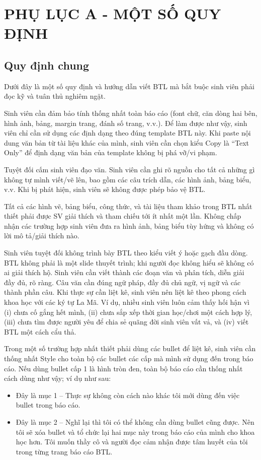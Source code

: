 \chapter*{PHỤ LỤC A - MỘT SỐ QUY ĐỊNH}
\section*{Quy định chung}
Dưới đây là một số quy định và hướng dẫn viết BTL mà bắt buộc sinh viên phải đọc kỹ và tuân thủ nghiêm ngặt.

Sinh viên cần đảm bảo tính thống nhất toàn báo cáo (font chữ, căn dòng hai bên, hình ảnh, bảng, margin trang, đánh số trang, v.v.). Để làm được như vậy, sinh viên chỉ cần sử dụng các định dạng theo đúng template BTL này. Khi paste nội dung văn bản từ tài liệu khác của mình, sinh viên cần chọn kiểu Copy là “Text Only” để định dạng văn bản của template không bị phá vỡ/vi phạm.

Tuyệt đối cấm sinh viên đạo văn. Sinh viên cần ghi rõ nguồn cho tất cả những gì không tự mình viết/vẽ lên, bao gồm các câu trích dẫn, các hình ảnh, bảng biểu, v.v. Khi bị phát hiện, sinh viên sẽ không được phép bảo vệ BTL.

Tất cả các hình vẽ, bảng biểu, công thức, và tài liệu tham khảo trong BTL nhất thiết phải được SV giải thích và tham chiếu tới ít nhất một lần. Không chấp nhận các trường hợp sinh viên đưa ra hình ảnh, bảng biểu tùy hứng và không có lời mô tả/giải thích nào.

Sinh viên tuyệt đối không trình bày BTL theo kiểu viết ý hoặc gạch đầu dòng. BTL không phải là một slide thuyết trình; khi người đọc không hiểu sẽ không có ai giải thích hộ. Sinh viên cần viết thành các đoạn văn và phân tích, diễn giải đầy đủ, rõ ràng. Câu văn cần đúng ngữ pháp, đầy đủ chủ ngữ, vị ngữ và các thành phần câu.
Khi thực sự cần liệt kê, sinh viên nên liệt kê theo phong cách khoa học với các ký tự La Mã. Ví dụ, nhiều sinh viên luôn cảm thấy hối hận vì (i) chưa cố gắng hết mình, (ii) chưa sắp xếp thời gian học/chơi một cách hợp lý, (iii) chưa tìm được người yêu để chia sẻ quãng đời sinh viên vất vả, và (iv) viết BTL một cách cẩu thả.

Trong một số trường hợp nhất thiết phải dùng các bullet để liệt kê, sinh viên cần thống nhất Style cho toàn bộ các bullet các cấp mà mình sử dụng đến trong báo cáo. Nếu dùng bullet cấp 1 là hình tròn đen, toàn bộ báo cáo cần thống nhất cách dùng như vậy; ví dụ như sau:

\begin{itemize}
\item Đây là mục 1 – Thực sự không còn cách nào khác tôi mới dùng đến việc bullet trong báo cáo.
\item Đây là mục 2 – Nghĩ lại thì tôi có thể không cần dùng bullet cũng được. Nên tôi sẽ xóa bullet và tổ chức lại hai mục này trong báo cáo của mình cho khoa học hơn. Tôi muốn thầy cô và người đọc cảm nhận được tâm huyết của tôi trong từng trang báo cáo BTL.
\end{itemize}


